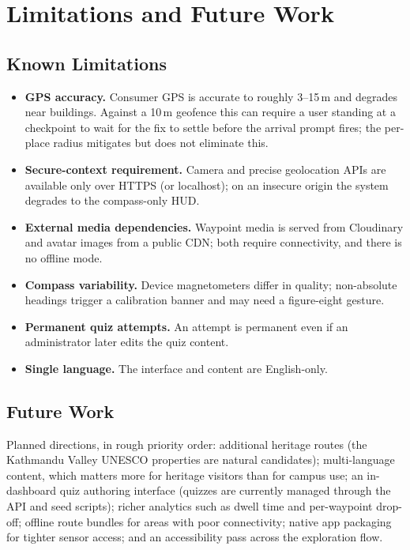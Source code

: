 \chapter{Limitations and Future Work}
\label{ch:future-work}

\section{Known Limitations}
\begin{itemize}
  \item \textbf{GPS accuracy.} Consumer GPS is accurate to roughly
        3--15\,m and degrades near buildings. Against a 10\,m geofence this
        can require a user standing at a checkpoint to wait for the fix to
        settle before the arrival prompt fires; the per-place radius
        mitigates but does not eliminate this.
  \item \textbf{Secure-context requirement.} Camera and precise
        geolocation APIs are available only over HTTPS (or localhost); on
        an insecure origin the system degrades to the compass-only HUD.
  \item \textbf{External media dependencies.} Waypoint media is served
        from Cloudinary and avatar images from a public CDN; both require
        connectivity, and there is no offline mode.
  \item \textbf{Compass variability.} Device magnetometers differ in
        quality; non-absolute headings trigger a calibration banner and
        may need a figure-eight gesture.
  \item \textbf{Permanent quiz attempts.} An attempt is permanent even if
        an administrator later edits the quiz content.
  \item \textbf{Single language.} The interface and content are
        English-only.
\end{itemize}

\section{Future Work}
Planned directions, in rough priority order: additional heritage routes
(the Kathmandu Valley UNESCO properties are natural candidates);
multi-language content, which matters more for heritage visitors than for
campus use; an in-dashboard quiz authoring interface (quizzes are currently
managed through the API and seed scripts); richer analytics such as dwell
time and per-waypoint drop-off; offline route bundles for areas with poor
connectivity; native app packaging for tighter sensor access; and an
accessibility pass across the exploration flow.
